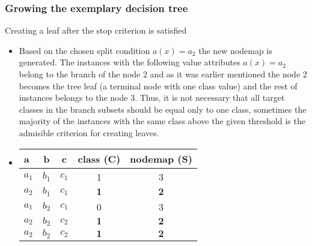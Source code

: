 \documentclass[smaller, proffesionalfonts]{beamer}
\def\bm{\boldsymbol}
\begin{document}
\begin{frame}
\frametitle{Growing the exemplary decision tree}
\begin{block}{Creating a leaf after the stop criterion is satisfied}
\begin{itemize}
\item
\justifying
Based on the chosen split condition $a(x)=a_2$ the new nodemap is generated. The instances with the following value attributes $a(x)=a_2$ belong to the branch of the node 2 and as it was earlier mentioned the node 2 becomes the tree leaf (a terminal node with one class value) and the rest of instances belongs to the node 3. Thus, it is not necessary that all target classes in the branch subsets should be equal only to one class, sometimes the majority of the instances with the same class above the given threshold is the admisible criterion for creating leaves. 
\item[\ ]
\begin{center}
{\sf
   \begin{tabular}{|p{3mm}||c|c||c||c|}
   \hline 
   a & b & c & class (C) & nodemap (S)\\
   \hline
   \hline
    $a_1$ & $b_1$ & $c_1$ & 1 & 3 \\
   \hline
    $a_2$ & $b_1$ & $c_1$ & $\bm 1$ & $\bm 2$ \\
   \hline
    $a_1$ & $b_2$ & $c_1$ & 0 & 3 \\
   \hline
    $a_2$ & $b_2$ & $c_2$ & $\bm 1$ & $\bm 2$ \\
   \hline
    $a_2$ & $b_2$ & $c_2$ & $\bm 1$ & $\bm 2$ \\
   \hline
   \end{tabular}
}
\end{center}
\end{itemize}
\end{block}
\end{frame}
\end{document}
